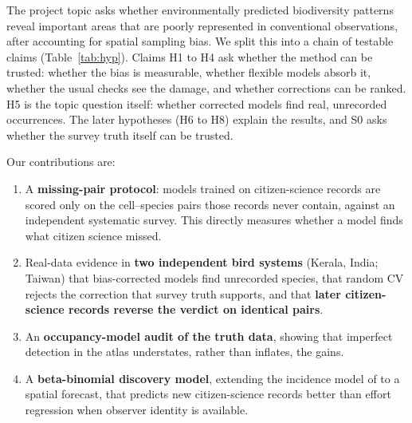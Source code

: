 \documentclass[11pt]{article}
\begin{document}
The project topic asks whether environmentally predicted biodiversity patterns reveal important areas that are poorly represented in conventional observations, after accounting for spatial sampling bias. We split this into a chain of testable claims (Table~\ref{tab:hyp}). Claims H1 to H4 ask whether the method can be trusted: whether the bias is measurable, whether flexible models absorb it, whether the usual checks see the damage, and whether corrections can be ranked. H5 is the topic question itself: whether corrected models find real, unrecorded occurrences. The later hypotheses (H6 to H8) explain the results, and S0 asks whether the survey truth itself can be trusted.

Our contributions are:
\begin{enumerate}\setlength\itemsep{1pt}
\item A \textbf{missing-pair protocol}: models trained on citizen-science records are scored only on the cell--species pairs those records never contain, against an independent systematic survey. This directly measures whether a model finds what citizen science missed.
\item Real-data evidence in \textbf{two independent bird systems} (Kerala, India; Taiwan) that bias-corrected models find unrecorded species, that random CV rejects the correction that survey truth supports, and that \textbf{later citizen-science records reverse the verdict on identical pairs}.
\item An \textbf{occupancy-model audit of the truth data}, showing that imperfect detection in the atlas understates, rather than inflates, the gains.
\item A \textbf{beta-binomial discovery model}, extending the incidence model of \citet{chiu2022} to a spatial forecast, that predicts new citizen-science records better than effort regression when observer identity is available.
\end{enumerate}
\end{document}
